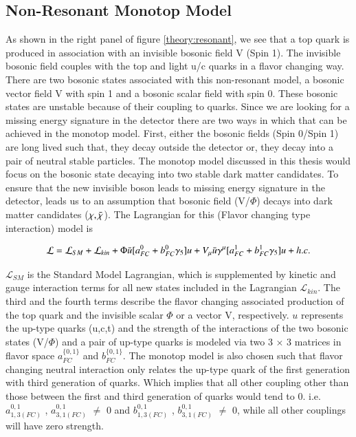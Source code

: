 \subsection{Non-Resonant Monotop Model}
As shown in the right panel of figure \ref{theory:resonant}, we see that a top quark is produced in association with an invisible bosonic field V (Spin 1). The invisible bosonic field couples with the top and light u/c quarks in a flavor changing way. There are two bosonic states associated with this non-resonant model, a bosonic vector field V with spin 1 and a bosonic scalar field with spin 0. These bosonic states are unstable because of their coupling to quarks. Since we are looking for a missing energy signature in the detector there are two ways in which that can be achieved in the monotop model. First, either the bosonic fields (Spin 0/Spin 1) are long lived such that, they decay outside the detector or, they decay into a pair of neutral stable particles. The monotop model discussed in this thesis would focus on the bosonic state decaying into two stable dark matter candidates. To ensure that the new invisible boson leads to missing energy signature in the detector, leads us to an assumption that bosonic field (V/$\Phi$) decays into dark matter candidates ($\chi, \Bar{\chi}$). The Lagrangian \cite{monotoptheory:2} for this (Flavor changing type interaction) model is 

\begingroup
\large
\begin{equation}
\mathcal{L} = \mathcal{L}_{SM} + \mathcal{L}_{kin} + 
\Phi\Bar{u}[a^{0}_{FC} + b^{0}_{FC}\gamma_{5}]u + V_{\mu}\Bar{u}\gamma^{\mu}[a^{1}_{FC} + b^{1}_{FC}\gamma_{5}]u + h.c.
  \label{eq:lagrangian_monotop}
\end{equation}
\endgroup

$\mathcal{L}_{SM}$ is the Standard Model Lagrangian, which is supplemented by kinetic and gauge interaction terms for all new states included in the Lagrangian $\mathcal{L}_{kin}$. The third and the fourth terms describe the flavor changing associated production of the top quark and the invisible scalar $\Phi$ or a vector V, respectively. $u$ represents the up-type quarks (u,c,t) and the strength of the interactions of the two bosonic states (V/$\Phi$) and a pair of up-type quarks is modeled via two 3 $\times$ 3 matrices in flavor space $a_{FC}^{\{0,1\}}$ and $b_{FC}^{\{0,1\}}$. The monotop model is also chosen such that flavor changing neutral interaction only relates the up-type quark of the first generation with third generation of quarks. Which implies that all other coupling other than those between the first and third generation of quarks would tend to 0. i.e. $a_{1,3 (FC)}^{0,1}$ , $a_{3,1 (FC)}^{0,1}$ $\neq$ 0 and $b_{1,3 (FC)}^{0,1}$ , $b_{3,1 (FC)}^{0,1}$ $\neq$ 0, while all other couplings will have zero strength.

